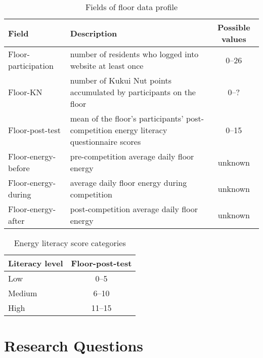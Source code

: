 \begin{table}[htbp]
	\centering
		\begin{tabular}{| l | p{8cm} | c |}
			\hline
			Field & Description & Possible values \\ \hline
			
			Floor-participation & number of residents who logged into website at least once & 0--26 \\ \hline
	
			Floor-KN & number of Kukui Nut points accumulated by participants on the floor & 0--? \\ \hline

			Floor-post-test & mean of the floor's participants' post-competition energy literacy questionnaire scores & 0--15 \\ \hline

			Floor-energy-before & pre-competition average daily floor energy & unknown \\ \hline

			Floor-energy-during & average daily floor energy during competition & unknown \\ \hline

			Floor-energy-after & post-competition average daily floor energy & unknown \\ \hline

		\end{tabular}
	\caption{Fields of floor data profile}
	\label{tab:floor-profile}
\end{table}

\begin{table}[htbp]
	\centering
		\begin{tabular}{| l | c |}
			\hline
			Literacy level & Floor-post-test \\ \hline
				
			Low & 0--5 \\ \hline

			Medium & 6--10 \\ \hline

			High & 11--15 \\ \hline

		\end{tabular}
	\caption{Energy literacy score categories}
	\label{tab:literacy-categories}
\end{table}


\section{Research Questions}

